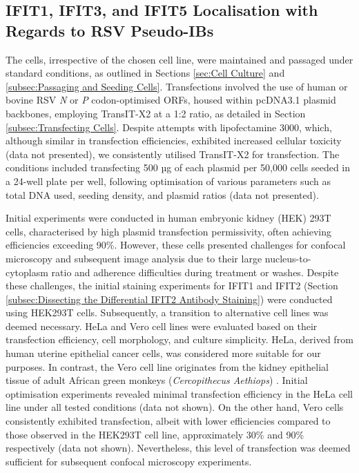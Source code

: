 \subsection{IFIT1, IFIT3, and IFIT5 Localisation with Regards to RSV Pseudo-IBs} \label{subsec:IFIT1, IFIT3, and IFIT5 Localisation with Regards to RSV Pseudo-IBs}
The cells, irrespective of the chosen cell line, were maintained and passaged under standard conditions, as outlined in Sections \ref{sec:Cell Culture} and \ref{subsec:Passaging and Seeding Cells}. Transfections involved the use of human or bovine RSV \textit{N} or \textit{P} codon-optimised ORFs, housed within pcDNA3.1 plasmid backbones, employing TransIT-X2 at a 1:2 ratio, as detailed in Section \ref{subsec:Transfecting Cells}. Despite attempts with lipofectamine 3000, which, although similar in transfection efficiencies, exhibited increased cellular toxicity (data not presented), we consistently utilised TransIT-X2 for transfection. The conditions included transfecting 500 µg of each plasmid per 50,000 cells seeded in a 24-well plate per well, following optimisation of various parameters such as total DNA used, seeding density, and plasmid ratios (data not presented).

Initial experiments were conducted in human embryonic kidney (HEK) 293T cells, characterised by high plasmid transfection permissivity, often achieving efficiencies exceeding 90\%. However, these cells presented challenges for confocal microscopy and subsequent image analysis due to their large nucleus-to-cytoplasm ratio and adherence difficulties during treatment or washes. Despite these challenges, the initial staining experiments for IFIT1 and IFIT2 (Section \ref{subsec:Dissecting the Differential IFIT2 Antibody Staining}) were conducted using HEK293T cells. Subsequently, a transition to alternative cell lines was deemed necessary. HeLa and Vero cell lines were evaluated based on their transfection efficiency, cell morphology, and culture simplicity. HeLa, derived from human uterine epithelial cancer cells, was considered more suitable for our purposes. In contrast, the Vero cell line originates from the kidney epithelial tissue of adult African green monkeys (\textit{Cercopithecus Aethiops}) \cite{Simizu1967CharacterizationVero}. Initial optimisation experiments revealed minimal transfection efficiency in the HeLa cell line under all tested conditions (data not shown). On the other hand, Vero cells consistently exhibited transfection, albeit with lower efficiencies compared to those observed in the HEK293T cell line, approximately 30\% and 90\% respectively (data not shown). Nevertheless, this level of transfection was deemed sufficient for subsequent confocal microscopy experiments.


